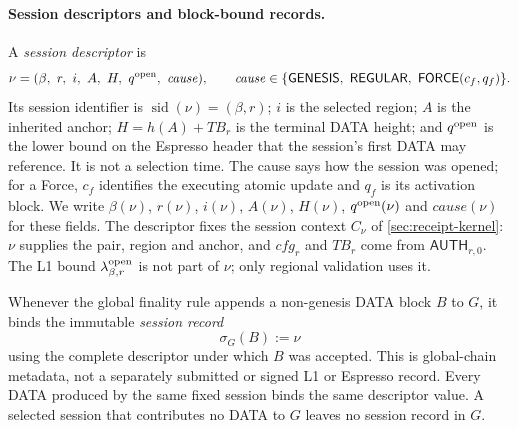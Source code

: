 \documentclass[11pt,a4paper]{article}
\newcommand{\TB}{\mathit{TB}}
\newcommand{\tagg}[1]{\ensuremath{\mathsf{#1}}}
\newcommand{\defterm}[1]{\textcolor{rrBlue}{\textit{#1}}}
\begin{document}
\paragraph{Session descriptors and block-bound records.}
A \defterm{session descriptor} is
\[
 \nu=(\beta,\ r,\ i,\ A,\ H,\ q^{\rm open},\ \mathit{cause}),\qquad
 \mathit{cause}\in\{\tagg{GENESIS},\ \tagg{REGULAR},\
 \tagg{FORCE}(c_f,q_f)\}.
\]
Its session identifier is $\operatorname{sid}(\nu)=(\beta,r)$; $i$ is
the selected region; $A$ is the inherited anchor;
$H=h(A)+\TB_r$ is the terminal DATA height; and $q^{\rm open}$ is the
lower bound on the Espresso header that the session's first DATA may
reference. It is not a selection time. The cause says how the
session was opened; for a Force, $c_f$ identifies the executing atomic
update and $q_f$ is its activation block.  We write $\beta(\nu)$,
$r(\nu)$, $i(\nu)$,
$A(\nu)$, $H(\nu)$, $q^{\rm open}(\nu)$ and
$\mathit{cause}(\nu)$ for these fields.  The descriptor fixes the session context $C_\nu$
of \cref{sec:receipt-kernel}: $\nu$ supplies the pair, region and anchor,
and $\mathit{cfg}_r$ and $\TB_r$ come from $\tagg{AUTH}_{r,0}$.  The L1
bound $\lambda^{\rm open}_{\beta,r}$ is not part of $\nu$; only regional
validation uses it.

Whenever the global finality rule appends a non-genesis DATA block
$B$ to $G$, it binds the immutable \defterm{session record}
\[
 \sigma_G(B):=\nu
\]
using the complete descriptor under which $B$ was accepted. This is
global-chain metadata, not a separately submitted or signed L1 or
Espresso record.  Every DATA produced by the same fixed session binds
the same descriptor value.  A selected session that contributes no DATA
to $G$ leaves no session record in $G$.
\end{document}
